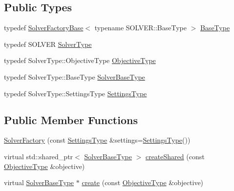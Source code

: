 \subsection*{Public Types}
\begin{DoxyCompactItemize}
\item 
typedef \hyperlink{classnifty_1_1graph_1_1optimization_1_1common_1_1SolverFactoryBase}{Solver\+Factory\+Base}$<$ typename S\+O\+L\+V\+E\+R\+::\+Base\+Type $>$ \hyperlink{classnifty_1_1graph_1_1optimization_1_1common_1_1SolverFactory_ad24c8394896a45089f47605367f5a2d1}{Base\+Type}
\item 
typedef S\+O\+L\+V\+E\+R \hyperlink{classnifty_1_1graph_1_1optimization_1_1common_1_1SolverFactory_a76aeead4fe93c3973e6c82a38cb898b7}{Solver\+Type}
\item 
typedef Solver\+Type\+::\+Objective\+Type \hyperlink{classnifty_1_1graph_1_1optimization_1_1common_1_1SolverFactory_a911173d92aaff4f9071dd8207de09f34}{Objective\+Type}
\item 
typedef Solver\+Type\+::\+Base\+Type \hyperlink{classnifty_1_1graph_1_1optimization_1_1common_1_1SolverFactory_a8e00f6151223974eb0e48236023451d2}{Solver\+Base\+Type}
\item 
typedef Solver\+Type\+::\+Settings\+Type \hyperlink{classnifty_1_1graph_1_1optimization_1_1common_1_1SolverFactory_acb8bf1b9189609a018ee99c2eb3216d9}{Settings\+Type}
\end{DoxyCompactItemize}
\subsection*{Public Member Functions}
\begin{DoxyCompactItemize}
\item 
\hyperlink{classnifty_1_1graph_1_1optimization_1_1common_1_1SolverFactory_aea16c2fe5e3c8e1a1f23b964e1b2b7cd}{Solver\+Factory} (const \hyperlink{classnifty_1_1graph_1_1optimization_1_1common_1_1SolverFactory_acb8bf1b9189609a018ee99c2eb3216d9}{Settings\+Type} \&settings=\hyperlink{classnifty_1_1graph_1_1optimization_1_1common_1_1SolverFactory_acb8bf1b9189609a018ee99c2eb3216d9}{Settings\+Type}())
\item 
virtual std\+::shared\+\_\+ptr$<$ \hyperlink{classnifty_1_1graph_1_1optimization_1_1common_1_1SolverFactory_a8e00f6151223974eb0e48236023451d2}{Solver\+Base\+Type} $>$ \hyperlink{classnifty_1_1graph_1_1optimization_1_1common_1_1SolverFactory_a634641d2363284b4367d741b29b028e0}{create\+Shared} (const \hyperlink{classnifty_1_1graph_1_1optimization_1_1common_1_1SolverFactory_a911173d92aaff4f9071dd8207de09f34}{Objective\+Type} \&objective)
\item 
virtual \hyperlink{classnifty_1_1graph_1_1optimization_1_1common_1_1SolverFactory_a8e00f6151223974eb0e48236023451d2}{Solver\+Base\+Type} $\ast$ \hyperlink{classnifty_1_1graph_1_1optimization_1_1common_1_1SolverFactory_abe330cf18c046333bf5cbe4694f84879}{create} (const \hyperlink{classnifty_1_1graph_1_1optimization_1_1common_1_1SolverFactory_a911173d92aaff4f9071dd8207de09f34}{Objective\+Type} \&objective)
\end{DoxyCompactItemize}



